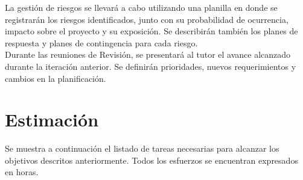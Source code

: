 \documentclass[
11pt, %
oneside, %
spanish, %
singlespacing, %
headsepline, %
chapterinoneline, %
]{MastersDoctoralThesis} %
\begin{document}
La gestión de riesgos se llevará a cabo utilizando una planilla en donde se registrarán los riesgos identificados, junto con su probabilidad de ocurrencia, impacto sobre el proyecto y su exposición. Se describirán también los planes de respuesta y planes de contingencia para cada riesgo. \\

Durante las reuniones de Revisión, se presentará al tutor el avance alcanzado durante la iteración anterior. Se definirán prioridades, nuevos requerimientos y cambios en la planificación.

\section{Estimaci\'on} \label{estimacion}

Se muestra a continuación el listado de tareas necesarias para alcanzar los objetivos descritos anteriormente. Todos los esfuerzos se encuentran expresados en horas.
\end{document}
